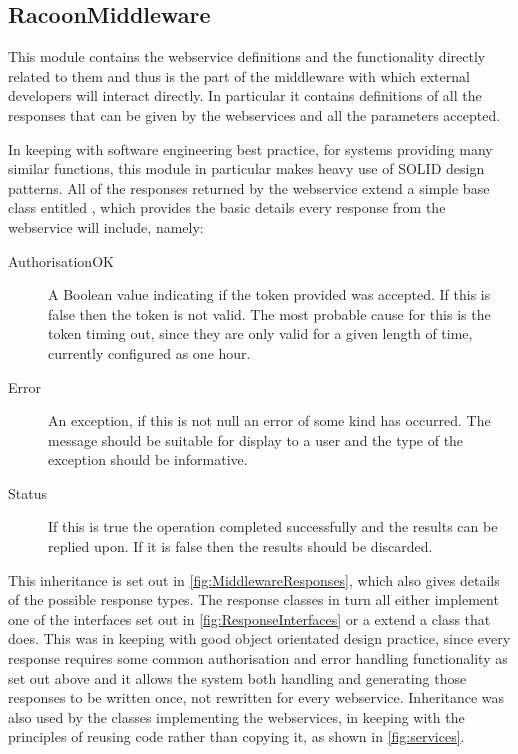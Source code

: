 \subsection{RacoonMiddleware}
\label{sec:middlewaremodule}
This module contains the webservice definitions and the functionality directly related to them and thus is the part of the middleware with which external developers will interact directly. In particular it contains definitions of all the responses that can be given by the webservices and all the parameters accepted.

In keeping with software engineering best practice, for systems providing many similar functions, this module in particular makes heavy use of SOLID design patterns. All of the responses returned by the webservice extend a simple base class entitled , which provides the basic details every response from the webservice will include, namely:
\begin{description}
    \item[AuthorisationOK] A Boolean value indicating if the token provided was accepted. If this is false then the token is not valid. The most probable cause for this is the token timing out, since they are only valid for a given length of time, currently configured as one hour.
    \item[Error] An exception, if this is not null an error of some kind has occurred. The message should be suitable for display to a user and the type of the exception should be informative.
    \item[Status] If this is true the operation completed successfully and the results can be replied upon. If it is false then the results should be discarded. 
\end{description}

This inheritance is set out in \autoref{fig:MiddlewareResponses}, which also gives details of the possible response types. The response classes in turn all either implement one of the interfaces set out in \autoref{fig:ResponseInterfaces} or a extend a class that does. This was in keeping with good object orientated design practice, since every response requires some common authorisation and error handling functionality as set out above and it allows the system both handling and generating those responses to be written once, not rewritten for every webservice.  Inheritance was also used by the classes implementing the webservices, in keeping with the principles of reusing code rather than copying it, as shown in \autoref{fig:services}.

